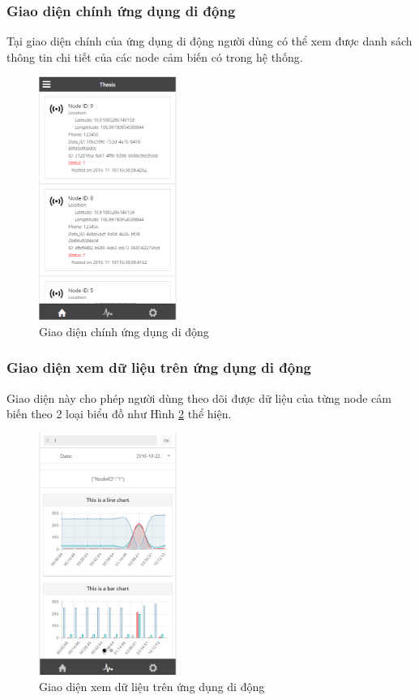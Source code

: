 \subsubsection*{Giao diện chính ứng dụng di động}
Tại giao diện chính của ứng dụng di động người dùng có thể xem được danh sách thông tin chi tiết của các node cảm biến có trong hệ thống.
\begin{center}
\begin{figure}[H]
\centering    
\includegraphics[width=0.4\textwidth]{app_main}
\caption[Giao diện chính ứng dụng di động]{Giao diện chính ứng dụng di động}
\label{fig:app_main}
\end{figure}
\end{center}


\subsubsection*{Giao diện xem dữ liệu trên ứng dụng di động}
Giao diện này cho phép người dùng theo dõi được dữ liệu của từng node cảm biến theo 2 loại biểu đồ như Hình \ref{fig:app_graph} thể hiện.
\begin{center}
\begin{figure}[H]
\centering    
\includegraphics[width=0.4\textwidth]{app_graph}
\caption[Giao diện xem dữ liệu trên ứng dụng di động]{Giao diện xem dữ liệu trên ứng dụng di động}
\label{fig:app_graph}
\end{figure}
\end{center}


